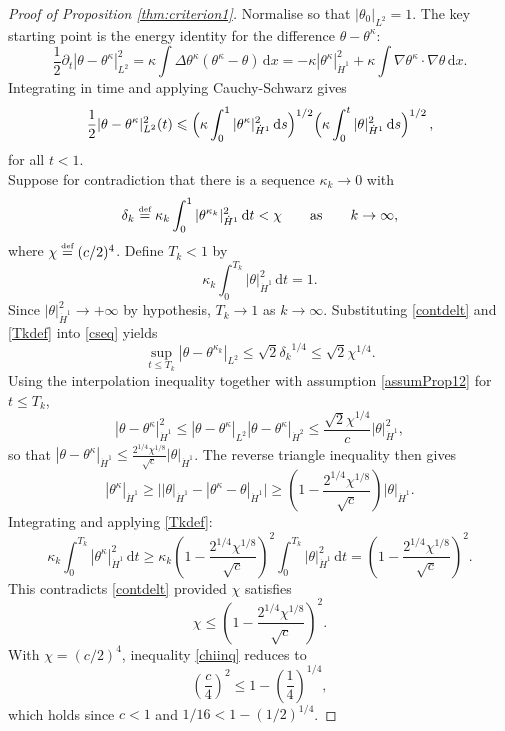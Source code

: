 \documentclass[12pt]{report}   %
\newcommand{\defeq}{\stackrel{\scriptscriptstyle\textup{def}}{=}}
\renewcommand{\le}{\leqslant}
\renewcommand{\leq}{\leqslant}
\renewcommand{\ge}{\geqslant}
\renewcommand{\geq}{\geqslant}
\numberwithin{equation}{section}
\theoremstyle{plain}
\theoremstyle{definition}
\theoremstyle{remark}
\DeclarePairedDelimiter{\paren}{(}{)}
\newcommand{\rmd}{\, \mathrm{d}}
\begin{document}
\begin{proof}[Proof of Proposition \ref{thm:criterion1}]
  Normalise so that $|\theta_0|_{L^2} = 1$. The key starting point is the energy identity for the difference $\theta - \theta^\kappa$:
\[\frac{1}{2} \partial_t |\theta -\theta^\kappa|_{L^2}^2=\kappa\int\Delta \theta^\kappa (\theta^\kappa-\theta)\rmd x= -\kappa | \theta^\kappa|_{\dot{H}^1}^2 + \kappa\int\nabla \theta^\kappa\cdot \nabla \theta\rmd x.\]
Integrating in time and applying Cauchy-Schwarz gives
\begin{equation}\label{cseq}
  \frac{1}{2} |\theta -\theta^\kappa|_{L^2}^2(t)
    \le \paren[\Big]{\kappa\int_0^1|\theta^\kappa|_{\dot{H}^1}^2\rmd s}^{1/2}
      \paren[\Big]{\kappa\int_0^t|\theta |_{\dot{H}^1}^2\rmd s}^{1/2} \,,
\end{equation}
for all $t<1$. \\
Suppose for contradiction that there is a sequence $\kappa_k\rightarrow 0$ with
\begin{equation}\label{contdelt}
\delta_k \defeq \kappa_k\int_0^1|\theta ^{\kappa_k}|_{\dot{H}^1}^2\rmd t  < \chi   \qquad \text{as}\qquad k\to \infty,
\end{equation}
where $\chi \defeq (c/2)^4$. Define $T_k<1$ by
\begin{equation}\label{Tkdef}
\kappa_k\int_0^{T_k}|\theta |_{\dot{H}^1}^2\rmd t=1.
\end{equation}
Since $|\theta|_{\dot{H}^1}^2 \to +\infty$ by hypothesis, $T_k\to 1$ as $k\to\infty$. Substituting \eqref{contdelt} and \eqref{Tkdef} into \eqref{cseq} yields
 \[\sup_{t\le T_k}|\theta -\theta^{\kappa_k}|_{L^2}\le \sqrt{2}{\delta_k}^{1/4}\le \sqrt{2}{\chi}^{1/4}.\]
Using the interpolation inequality together with assumption \eqref{assumProp12} for $t\le T_k$,
\[|\theta -\theta^\kappa|_{\dot{H}^1}^2\le |\theta -\theta^\kappa|_{L^2}|\theta -\theta^\kappa|_{\dot{H}^2}\le   \frac{\sqrt{2}{\chi}^{1/4}}{c}|\theta |_{\dot{H}^1}^2,\]
so that $|\theta -\theta^\kappa|_{\dot{H}^1}\leq\frac{2^{1/4}{\chi}^{1/8}}{\sqrt{c}}|\theta |_{\dot{H}^1}$. The reverse triangle inequality then gives
\begin{equation}
|\theta^\kappa|_{\dot{H}^1} \geq \Big||\theta|_{\dot{H}^1}- |\theta^\kappa- \theta|_{\dot{H}^1}\Big| \geq \left(1-\frac{2^{1/4}{\chi}^{1/8}}{\sqrt{c}}\right)|\theta |_{\dot{H}^1}.
\end{equation}
Integrating and applying \eqref{Tkdef}:
\begin{equation}\label{conteqn}
\kappa_k\int_0^{T_k}|\theta^\kappa|_{\dot{H}^1}^2\rmd t\ge  \kappa_k\left(1-\frac{2^{1/4}{\chi}^{1/8}}{\sqrt{c}}\right)^2 \int_0^{T_k}|\theta|_{\dot{H}^1}^2\rmd t =\left(1-\frac{2^{1/4}{\chi}^{1/8}}{\sqrt{c}}\right)^2.
\end{equation}
This contradicts \eqref{contdelt} provided $\chi$ satisfies
\begin{equation}\label{chiinq}
\chi \leq \left(1-\frac{2^{1/4}{\chi}^{1/8}}{\sqrt{c}}\right)^2.
\end{equation}
With $\chi=(c/2)^4$, inequality \eqref{chiinq} reduces to
\[
\left(\frac{c}{4}\right)^2 \leq 1-\left(\frac{1}{4}\right)^{1/4},
\]
which holds since $c<1$ and $1/16< 1-\left({1}/{2}\right)^{1/4}$.
\end{proof}
\end{document}
